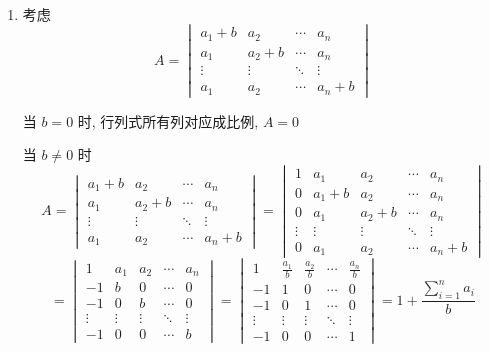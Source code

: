 	 \paragraph{} %
		 \begin{enumerate}
			 \item %
			       考虑
			       \[ A = \begin{vmatrix}
					       a_{1}+b & a_{2}   & \cdots & a_{n}   \\
					       a_{1}   & a_{2}+b & \cdots & a_{n}   \\
					       \vdots  & \vdots  & \ddots & \vdots  \\
					       a_{1}   & a_{2}   & \cdots & a_{n}+b
				       \end{vmatrix} \]

			       当 $b=0$ 时, 行列式所有列对应成比例, $A=0$

			       当 $b \neq 0$ 时
			       \[ A = \begin{vmatrix}
					       a_{1}+b & a_{2}   & \cdots & a_{n}   \\
					       a_{1}   & a_{2}+b & \cdots & a_{n}   \\
					       \vdots  & \vdots  & \ddots & \vdots  \\
					       a_{1}   & a_{2}   & \cdots & a_{n}+b
				       \end{vmatrix} = \begin{vmatrix}
					       1      & a_{1}   & a_{2}   & \cdots & a_{n}   \\
					       0      & a_{1}+b & a_{2}   & \cdots & a_{n}   \\
					       0      & a_{1}   & a_{2}+b & \cdots & a_{n}   \\
					       \vdots & \vdots  & \vdots  & \ddots & \vdots  \\
					       0      & a_{1}   & a_{2}   & \cdots & a_{n}+b
				       \end{vmatrix} \]
			       \[ = \begin{vmatrix}
					       1      & a_{1}  & a_{2}  & \cdots & a_{n}  \\
					       -1     & b      & 0      & \cdots & 0      \\
					       -1     & 0      & b      & \cdots & 0      \\
					       \vdots & \vdots & \vdots & \ddots & \vdots \\
					       -1     & 0      & 0      & \cdots & b
				       \end{vmatrix} = \begin{vmatrix}
					       1      & \frac{a_{1}}{b} & \frac{a_{2}}{b} & \cdots & \frac{a_{n}}{b} \\
					       -1     & 1               & 0               & \cdots & 0               \\
					       -1     & 0               & 1               & \cdots & 0               \\
					       \vdots & \vdots          & \vdots          & \ddots & \vdots          \\
					       -1     & 0               & 0               & \cdots & 1
				       \end{vmatrix} = 1 + \frac{\displaystyle \sum_{i=1}^{n} a_{i}}{b} \]


\end{enumerate}
